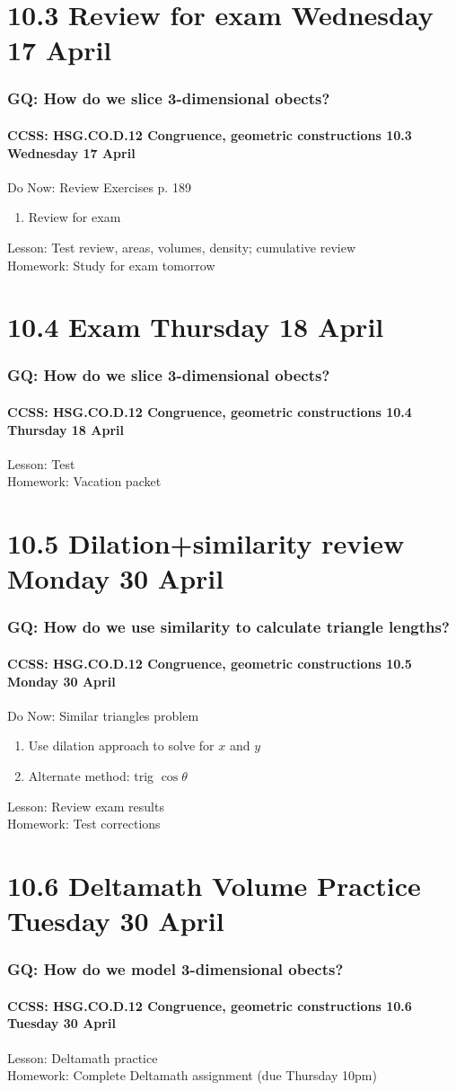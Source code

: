 \documentclass{beamer}
\begin{document}
\section{10.3 Review for exam Wednesday 17 April}
  \frame
  {
    \frametitle{GQ: How do we slice 3-dimensional obects?}
    \framesubtitle{CCSS: HSG.CO.D.12 Congruence, geometric constructions \hfill \alert{10.3 Wednesday 17 April}}

    \begin{block}{Do Now: Review Exercises p. 189}
      \begin{enumerate}
        \item Review for exam
    \end{enumerate}
    \end{block}
    Lesson: Test review, areas, volumes, density; cumulative review\\[1cm]
    Homework: Study for \alert{exam tomorrow}
  }

\section{10.4 Exam Thursday 18 April}
  \frame
  {
    \frametitle{GQ: How do we slice 3-dimensional obects?}
    \framesubtitle{CCSS: HSG.CO.D.12 Congruence, geometric constructions \hfill \alert{10.4 Thursday 18 April}}

    Lesson: Test \\[1cm]
    Homework: Vacation packet
  }

\section{10.5 Dilation+similarity review Monday 30 April}
  \frame
  {
    \frametitle{GQ: How do we use similarity to calculate triangle lengths?}
    \framesubtitle{CCSS: HSG.CO.D.12 Congruence, geometric constructions \hfill \alert{10.5 Monday 30 April}}
    \begin{block}{Do Now: Similar triangles problem}
      \begin{enumerate}
        \item Use dilation approach to solve for $x$ and $y$
        \item Alternate method: trig $\cos \theta$
    \end{enumerate}
    \end{block}
    Lesson: Review exam results\\[1cm]
    Homework: Test corrections
  }

\section{10.6 Deltamath Volume Practice Tuesday 30 April}
  \frame
  {
    \frametitle{GQ: How do we model 3-dimensional obects?}
    \framesubtitle{CCSS: HSG.CO.D.12 Congruence, geometric constructions \hfill \alert{10.6 Tuesday 30 April}}

    Lesson: Deltamath practice \\[1cm]
    Homework: Complete Deltamath assignment (due Thursday 10pm)
  }
\end{document}
